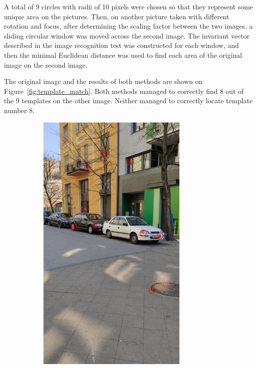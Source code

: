 A total of 9 circles with radii of 10 pixels were chosen so that they represent some unique area on the pictures. Then, on another picture taken with different rotation and focus, after determining the scaling factor between the two images, a sliding circular window was moved across the second image. The invariant vector described in the image recognition test was constructed for each window, and then the minimal Euclidean distance was used to find each area of the original image on the second image.

The original image and the results of both methods are shown on Figure~\ref{fig:template_match}.
Both methods managed to correctly find 8 out of the 9 templates on the other image. Neither managed to correctly locate template number 8.
\begin{figure}[tbp]
    \centering
    \begin{subfigure}{0.68\textwidth}
        \centering
    \includegraphics[width=0.8\textwidth, trim=0 200 0 80, clip]{figures/templates/template.png}

\end{subfigure}
\end{figure}
